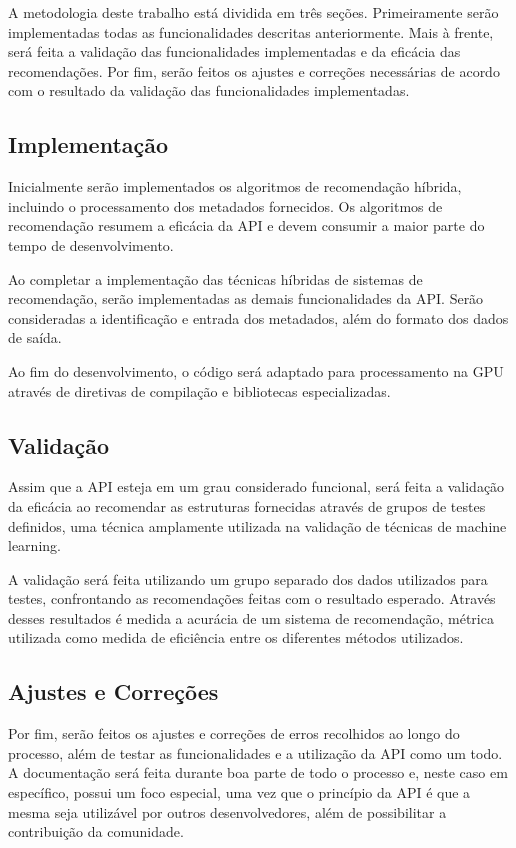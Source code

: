 \documentclass[12pt, openright, oneside, a4paper, brazil]{abntex2}
\begin{document}
A metodologia deste trabalho está dividida em três seções. Primeiramente serão implementadas todas as funcionalidades descritas anteriormente. Mais à frente, será feita a validação das funcionalidades implementadas e da eficácia das recomendações. Por fim, serão feitos os ajustes e correções necessárias de acordo com o resultado da validação das funcionalidades implementadas.

\subsection{Implementação}

Inicialmente serão implementados os algoritmos de recomendação híbrida, incluindo o processamento dos metadados fornecidos. Os algoritmos de recomendação resumem a eficácia da API e devem consumir a maior parte do tempo de desenvolvimento.

Ao completar a implementação das técnicas híbridas de sistemas de recomendação, serão implementadas as demais funcionalidades da API. Serão consideradas a identificação e entrada dos metadados, além do formato dos dados de saída.

Ao fim do desenvolvimento, o código será adaptado para processamento na GPU através de diretivas de compilação e bibliotecas especializadas.

\subsection{Validação}

Assim que a API esteja em um grau considerado funcional, será feita a validação da eficácia ao recomendar as estruturas fornecidas através de grupos de testes definidos, uma técnica amplamente utilizada na validação de técnicas de machine learning.

A validação será feita utilizando um grupo separado dos  dados utilizados para testes, confrontando as recomendações feitas com o resultado esperado. Através desses resultados é medida a acurácia de um sistema de recomendação, métrica utilizada como medida de eficiência entre os diferentes métodos utilizados.

\subsection{Ajustes e Correções}

Por fim, serão feitos os ajustes e correções de erros recolhidos ao longo do processo, além de testar as funcionalidades e a utilização da API como um todo. A documentação será feita durante boa parte de todo o processo e, neste caso em específico, possui um foco especial, uma vez que o princípio da API é que a mesma seja utilizável por outros desenvolvedores, além de possibilitar a contribuição da comunidade.
\end{document}
